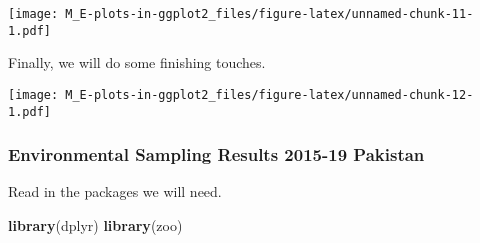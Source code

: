 \documentclass[]{article}
\newenvironment{Shaded}{\begin{snugshade}}{\end{snugshade}}
\newcommand{\CommentTok}[1]{\textcolor[rgb]{0.56,0.35,0.01}{\textit{#1}}}
\newcommand{\DataTypeTok}[1]{\textcolor[rgb]{0.13,0.29,0.53}{#1}}
\newcommand{\DecValTok}[1]{\textcolor[rgb]{0.00,0.00,0.81}{#1}}
\newcommand{\KeywordTok}[1]{\textcolor[rgb]{0.13,0.29,0.53}{\textbf{#1}}}
\newcommand{\NormalTok}[1]{#1}
\newcommand{\OperatorTok}[1]{\textcolor[rgb]{0.81,0.36,0.00}{\textbf{#1}}}
\newcommand{\StringTok}[1]{\textcolor[rgb]{0.31,0.60,0.02}{#1}}
\begin{document}
\texttt{[image: M\_E-plots-in-ggplot2\_files/figure-latex/unnamed-chunk-11-1.pdf]}

Finally, we will do some finishing touches.

\begin{Shaded}
\end{Shaded}

\texttt{[image: M\_E-plots-in-ggplot2\_files/figure-latex/unnamed-chunk-12-1.pdf]}

\hypertarget{environmental-sampling-results-2015-19-pakistan}{%
\subsubsection{Environmental Sampling Results 2015-19
Pakistan}\label{environmental-sampling-results-2015-19-pakistan}}

Read in the packages we will need.

\begin{Shaded}
\begin{Highlighting}[]
\KeywordTok{library}\NormalTok{(dplyr)}
\KeywordTok{library}\NormalTok{(zoo)}
\end{Highlighting}
\end{Shaded}
\end{document}
